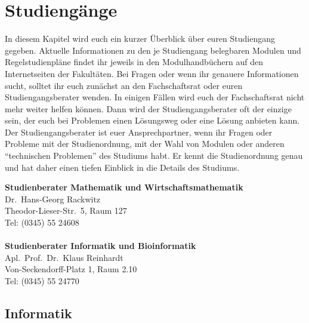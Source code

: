 
\section{Studiengänge}

In diesem Kapitel wird euch ein kurzer Überblick über euren Studiengang gegeben. Aktuelle Informationen zu den je Studiengang belegbaren Modulen und Regelstudienpläne findet ihr jeweils in den Modulhandbüchern auf den Internetseiten der Fakultäten.
Bei Fragen oder wenn ihr genauere Informationen sucht, solltet ihr euch zunächst an den Fachschaftsrat oder euren Studiengangsberater wenden.
In einigen Fällen wird euch der Fachschaftsrat nicht mehr weiter helfen können.
Dann wird der Studiengangsberater oft der einzige sein, der euch bei Problemen einen Lösungsweg oder eine Lösung anbieten kann.
Der Studiengangsberater ist euer Ansprechpartner, wenn ihr Fragen oder Probleme
mit der Studienordnung, mit der Wahl von Modulen oder anderen "`technischen Problemen"' des Studiums habt.
Er kennt die Studienordnung genau und hat daher einen tiefen Einblick in die Details des Studiums.

\textbf{Studienberater Mathematik und Wirtschaftsmathematik}\\
Dr.\ Hans-Georg Rackwitz\\
Theodor-Lieser-Str.\ 5, Raum 127\\
Tel: (0345) 55 24608\\
\\

\textbf{Studienberater Informatik und Bioinformatik}\\
Apl.\ Prof.\ Dr.\ Klaus Reinhardt\\
Von-Seckendorff-Platz 1, Raum 2.10\\
Tel: (0345) 55 24770\\



\subsection{Informatik}
\label{studiengang_informatik}

